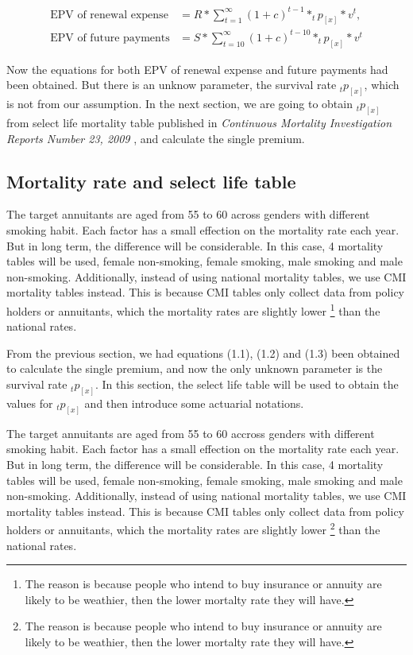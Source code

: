 \documentclass{report}
\begin{document}
\begin{align}
        \text{EPV of renewal expense}&= R  * \sum_{t=1}^{\infty}(1 + c )^{t-1} * _tp_{[x]}* v^t,\\
        \text{EPV of future payments}&= S * \sum_{t=10}^{\infty} (1 + c )^{t-10} * _tp_{[x]} * v^t
\end{align}


Now the equations for both EPV of renewal expense and future payments had been obtained. But there is an unknow parameter, the survival rate $_tp_{[x]}$, which is not from our assumption. In the next section, we are going to obtain $_tp_{[x]}$ from select life mortality table published in \textsl{Continuous Mortality Investigation Reports Number 23, 2009} \cite{bib:mortality-report}, and calculate the single premium.

\subsection{Mortality rate and select life table}

The target annuitants are aged from 55 to 60 across genders with different smoking habit. Each factor has a small effection on the mortality rate each year. But in long term, the difference will be considerable. In this case, 4 mortality tables will be used, female non-smoking, female smoking, male smoking and male non-smoking. Additionally, instead of using national mortality tables, we use CMI mortality tables instead. This is because CMI tables only collect data from policy holders or annuitants, which the mortality rates are slightly lower \footnote{The reason is because people who intend to buy insurance or annuity are likely to be weathier, then the lower mortalty rate they will have.} than the national rates.


From the previous section, we had equations (1.1), (1.2) and (1.3) been obtained to calculate the single premium, and now the only unknown parameter is the survival rate $_tp_{[x]}$. In this section, the select life table will be used to obtain the values for $_tp_{[x]}$ and then introduce some actuarial notations. 


The target annuitants are aged from 55 to 60 accross genders with different smoking habit. Each factor has a small effection on the mortality rate each year. But in long term, the difference will be considerable. In this case, 4 mortality tables will be used, female non-smoking, female smoking, male smoking and male non-smoking. Additionally, instead of using national mortality tables, we use CMI mortality tables instead. This is because CMI tables only collect data from policy holders or annuitants, which the mortality rates are slightly lower \footnote{The reason is because people who intend to buy insurance or annuity are likely to be weathier, then the lower mortalty rate they will have.} than the national rates.
\end{document}
